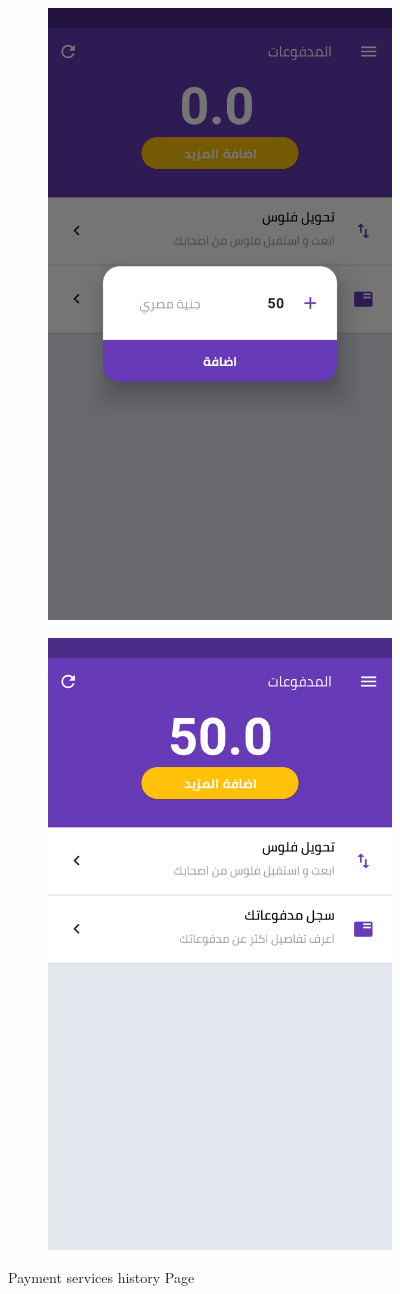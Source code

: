   \begin{figure}[H] 
 \begin{subfigure}[b]{0.5\linewidth}
    \centering
    \includegraphics[width=0.5\linewidth]{images/ch3/payment/Adding Credit/2.png}
  
  \end{subfigure}%
    \begin{subfigure}[b]{0.5\linewidth}
    \centering
    \includegraphics[width=0.5\linewidth]{images/ch3/payment/Adding Credit/3.png}
  
  \end{subfigure}%
    \caption{ Payment services history Page}

  \end{figure}

